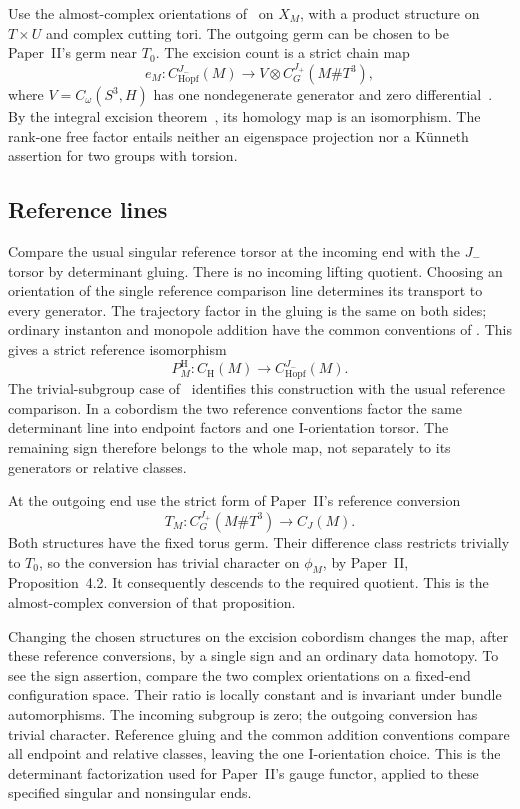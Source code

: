 \documentclass[11pt]{amsart}
\theoremstyle{definition}
\theoremstyle{remark}
\theoremstyle{plain}
\newcommand{\CH}{C_{\mathrm H}}
\newcommand{\CJ}{C_J}
\begin{document}
Use the almost-complex orientations of~\cite[Sections~5.1 and~5.3]{KM} on
$X_M$, with a product structure on $T\times U$ and complex cutting
tori. The outgoing germ can be chosen to be Paper~II's germ near
$T_0$. The excision count is a strict chain map
\begin{equation}\label{eq:excision-count}
 e_M:C_{\mathrm{Hopf}}^{J_-}(M)\longrightarrow
 V\otimes C_G^{J_+}(M\#T^3),
\end{equation}
where $V=C_\omega(S^3,H)$ has one nondegenerate generator and zero
differential~\cite[Proposition~4.1]{KM}. By the integral excision
theorem~\cite[Theorem~5.6]{KM}, its homology map is an isomorphism.
The rank-one free factor entails neither an eigenspace projection
nor a K\"unneth assertion for two groups with torsion.

\subsection{Reference lines}
Compare the usual singular reference torsor at the incoming end
with the $J_-$ torsor by determinant gluing. There is no incoming
lifting quotient. Choosing an orientation of the single reference
comparison line determines its transport to every generator. The
trajectory factor in the gluing is the same on both sides; ordinary
instanton and monopole addition have the common conventions of
\cite[Sections~3.8 and~4.4]{KM}. This gives a strict reference
isomorphism
\[
 P_M^{\mathrm H}:\CH(M)\longrightarrow C_{\mathrm{Hopf}}^{J_-}(M).
\]
The trivial-subgroup case of~\cite[Section~5.1, p.~154]{KM} identifies
this construction with the usual reference comparison. In a
cobordism the two reference conventions factor the same determinant
line into endpoint factors and one I-orientation torsor. The
remaining sign therefore belongs to the whole map, not separately
to its generators or relative classes.

At the outgoing end use the strict form of Paper~II's reference
conversion
\[
 T_M:C_G^{J_+}(M\#T^3)\longrightarrow\CJ(M).
\]
Both structures have the fixed torus germ. Their difference class
restricts trivially to $T_0$, so the conversion has trivial character
on $\phi_M$, by Paper~II, Proposition~4.2. It consequently descends
to the required quotient. This is the almost-complex conversion of that proposition.

Changing the chosen structures on the excision cobordism changes
the map, after these reference conversions, by a single sign and
an ordinary data homotopy. To see the sign assertion, compare the
two complex orientations on a fixed-end configuration space. Their
ratio is locally constant and is invariant under bundle
automorphisms. The incoming subgroup is zero; the outgoing
conversion has trivial character. Reference gluing and the common
addition conventions compare all endpoint and relative classes,
leaving the one I-orientation choice. This is the determinant
factorization used for Paper~II's gauge functor, applied to these
specified singular and nonsingular ends.
\end{document}
